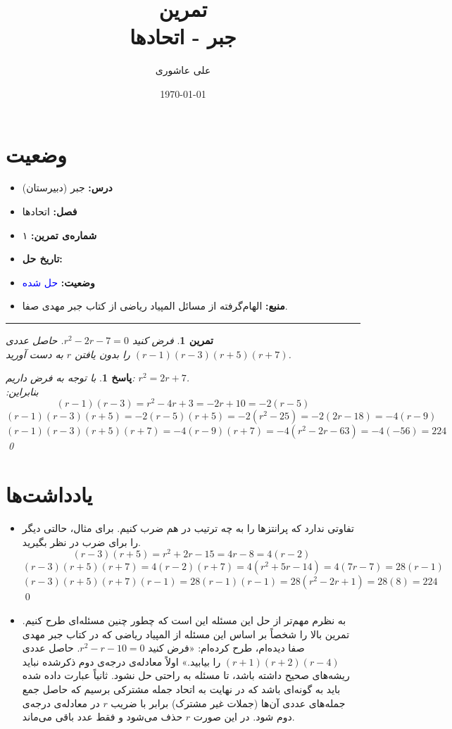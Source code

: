 \documentclass[a4paper,12pt]{article}
\title{%
	\Huge \textbf{تمرین} \\[0.3cm]
	\Large جبر - اتحادها
}
\author{علی عاشوری}
\date{\today}
\theoremstyle{exercise}
\newtheorem{exercise}{تمرین}
\newtheorem{solution}{پاسخ}
\begin{document}
	
	\maketitle
	
	\section*{وضعیت}
	\begin{itemize}
		\item \textbf{درس:} جبر (دبیرستان)
		\item \textbf{فصل:} اتحادها
		\item \textbf{شماره‌ی تمرین:} ۱
		\item \textbf{تاریخ حل:} 
		\item \textbf{وضعیت:} \textcolor{blue}{حل شده}
		\item \textbf{منبع:} الهام‌گرفته از مسائل المپیاد ریاضی از کتاب جبر مهدی صفا.
	\end{itemize}
	\rule{\textwidth}{0.4pt}
	
	\begin{exercise}
		فرض کنید
		$r^2-2r-7=0$.
		حاصل عددی
		$(r-1)(r-3)(r+5)(r+7)$
		را بدون یافتن $r$ به دست آورید.
	\end{exercise}
	
	\bigskip
	
	\begin{solution}
		با توجه به فرض داریم:
		$r^2=2r+7$. \\
		بنابراین:
		$$(r-1)(r-3)=r^2-4r+3=-2r+10=-2(r-5)$$
		$$(r-1)(r-3)(r+5)=-2(r-5)(r+5)=-2(r^2-25)=-2(2r-18)=-4(r-9)$$
		$$(r-1)(r-3)(r+5)(r+7)=-4(r-9)(r+7)=-4(r^2-2r-63)=-4(-56)=224$$
		\qed
	\end{solution}
	
	\section*{یادداشت‌ها}
	\begin{itemize}
		\item
		تفاوتی ندارد که پرانتزها را به چه ترتیب در هم ضرب کنیم. برای مثال، حالتی دیگر را برای ضرب در نظر بگیرید.
		$$(r-3)(r+5)=r^2+2r-15=4r-8=4(r-2)$$
		$$(r-3)(r+5)(r+7)=4(r-2)(r+7)=4(r^2+5r-14)=4(7r-7)=28(r-1)$$
		$$(r-3)(r+5)(r+7)(r-1)=28(r-1)(r-1)=28(r^2-2r+1)=28(8)=224$$
		\qed
		
		\item
		به نظرم مهم‌تر از حل این مسئله این است که چطور چنین مسئله‌ای طرح کنیم. تمرین بالا را شخصاً بر اساس این مسئله از المپیاد ریاضی که در کتاب جبر مهدی صفا دیده‌ام، طرح کرده‌ام: «فرض کنید
		$r^2-r-10=0$.
		حاصل عددی
		$(r+1)(r+2)(r-4)$
		را بیابید.» اولاً معادله‌ی درجه‌ی دوم ذکرشده نباید ریشه‌های صحیح داشته باشد، تا مسئله به راحتی حل نشود. ثانیاً عبارت داده شده باید به گونه‌ای باشد که در نهایت به اتحاد جمله مشترکی برسیم که حاصل جمع جمله‌های عددی آن‌ها (جملات غیر مشترک) برابر با ضریب $r$ در معادله‌ی درجه‌ی دوم شود. در این صورت $r$ حذف می‌شود و فقط عدد باقی می‌ماند.
	\end{itemize}
	
\end{document}
